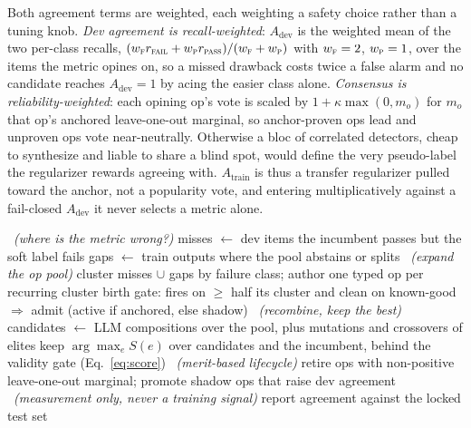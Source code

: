 \documentclass[letterpaper]{article} %
\newcommand{\algkey}[1]{{\setlength{\fboxsep}{1.5pt}\colorbox{mbluebg}{#1}}}
\begin{document}
Both agreement terms are weighted, each weighting a safety choice rather than a tuning knob. \emph{Dev agreement is recall-weighted}: $A_{\mathrm{dev}}$ is the weighted mean of the two per-class recalls, $(w_{\textsc{f}} r_{\textsc{fail}} + w_{\textsc{p}} r_{\textsc{pass}})/(w_{\textsc{f}} + w_{\textsc{p}})$ with $w_{\textsc{f}} = 2$, $w_{\textsc{p}} = 1$, over the items the metric opines on, so a missed drawback costs twice a false alarm and no candidate reaches $A_{\mathrm{dev}} = 1$ by acing the easier class alone. \emph{Consensus is reliability-weighted}: each opining op's vote is scaled by $1 + \kappa \max(0, m_o)$ for $m_o$ that op's anchored leave-one-out marginal, so anchor-proven ops lead and unproven ops vote near-neutrally. Otherwise a bloc of correlated detectors, cheap to synthesize and liable to share a blind spot, would define the very pseudo-label the regularizer rewards agreeing with. $A_{\mathrm{train}}$ is thus a transfer regularizer pulled toward the anchor, not a popularity vote, and entering multiplicatively against a fail-closed $A_{\mathrm{dev}}$ it never selects a metric alone.

\begin{algorithm}[t]
\caption{One round of metric evolution. Only the audit step reads the locked test set, and it never feeds back. Constants and the full lifecycle are in \hyperref[app:lang]{Appendix~C}.}
\label{alg:loop}
\begin{algorithmic}[1]
 \ {\footnotesize\color{inkmut}\emph{(where is the metric wrong?)}}
\STATE \quad misses $\gets$ dev items the incumbent passes but the soft label fails
\STATE \quad gaps $\gets$ train outputs where the pool abstains or splits
 \ {\footnotesize\color{inkmut}\emph{(expand the op pool)}}
\STATE \quad cluster misses $\cup$ gaps by failure class; author one typed op per recurring cluster
\STATE \quad birth gate: fires on $\geq$ half its cluster and clean on known-good $\Rightarrow$ admit (\algkey{active if anchored, else shadow})
 \ {\footnotesize\color{inkmut}\emph{(recombine, keep the best)}}
\STATE \quad candidates $\gets$ LLM compositions over the pool, plus \algkey{mutations and crossovers of elites}
\STATE \quad keep $\arg\max_e S(e)$ over candidates and the incumbent, behind the validity gate (Eq.~\ref{eq:score})
 \ {\footnotesize\color{inkmut}\emph{(merit-based lifecycle)}}
\STATE \quad retire ops with non-positive \algkey{leave-one-out marginal}; promote shadow ops that raise dev agreement
 \ {\footnotesize\color{inkmut}\emph{(measurement only, never a training signal)}}
\STATE \quad report agreement against the locked test set
\end{algorithmic}
\end{algorithm}
\end{document}
